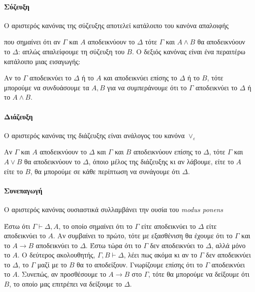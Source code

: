 \documentclass [a4paper,11pt] {book}
\theoremstyle{definition}
\theoremstyle{definition}
\begin{document}
\paragraph{Σύζευξη}
\label{Conjunction}
Ο αριστερός κανόνας της σύζευξης αποτελεί κατάλοιπο του κανόνα απαλοιφής
\begin{prooftree}
\end{prooftree}
που σημαίνει ότι αν $\Gamma$ και $A$ αποδεικνύουν το $\Delta$ τότε $\Gamma$ και $A\wedge B$ θα αποδεικνύουν το $\Delta$: απλώς απαλείφουμε τη σύζευξη του $B$. Ο δεξιός κανόνας είναι ένα περαιτέρω κατάλοιπο μιας εισαγωγής:
\begin{prooftree}
\end{prooftree}
Αν το $\Gamma$ αποδεικνύει το $\Delta$ ή το $A$ και αποδεικνύει επίσης το $\Delta$ ή το $B$, τότε μπορούμε να συνδυάσουμε τα $A,B$ για να συμπεράνουμε ότι το $\Gamma$ αποδεικνύει το $\Delta$ ή το $A \wedge B$.
\paragraph{Διάζευξη}
\label{Disjunction}
Ο αριστερός κανόνας της διάζευξης είναι ανάλογος του κανόνα $\vee_{\varepsilon}$
\begin{prooftree}
\end{prooftree}
Αν $\Gamma$ και $A$ αποδεικνύουν το $\Delta$ και $\Gamma$ και $B$ αποδεικνύουν επίσης το $\Delta$, τότε $\Gamma$ και $A\vee B$ θα αποδεικνύουν το $\Delta$, όποιο μέλος της διάζευξης κι αν λάβουμε, είτε το $A$ είτε το $B$, θα μπορούμε σε κάθε περίπτωση να συνάγουμε ότι $\Delta$.
\paragraph{Συνεπαγωγή}
\label{Implication}
Ο αριστερός κανόνας ουσιαστικά συλλαμβάνει την ουσία του \textit{modus ponens}
\begin{prooftree}
\end{prooftree}
Έστω ότι $\Gamma\vdash\Delta,A$, το οποίο σημαίνει ότι το $\Gamma$ είτε αποδεικνύει το $\Delta$ είτε αποδεικνύει το $A$. Αν συμβαίνει το πρώτο, τότε με εξασθένιση θα έχουμε ότι το $\Gamma$ και το $A\to B$ αποδεικνύει το $\Delta$. Έστω τώρα ότι το $\Gamma$ δεν αποδεικνύει το $\Delta$, αλλά μόνο το $A$. Ο δεύτερος ακολουθητής, $\Gamma,B\vdash\Delta$, λέει πως ακόμα κι αν το $\Gamma$ δεν αποδεικνύει το $\Delta$, το $\Gamma$ μαζί με το $B$ θα το αποδείξουν. Γνωρίζουμε επίσης ότι το $\Gamma$ αποδεικνύει το $A$. Συνεπώς, αν προσθέσουμε το $A\to B$ στο $\Gamma$, τότε θα μπορούμε να δείξουμε ότι $B$, το οποίο μας επιτρέπει να δείξουμε το $\Delta$.
\end{document}
